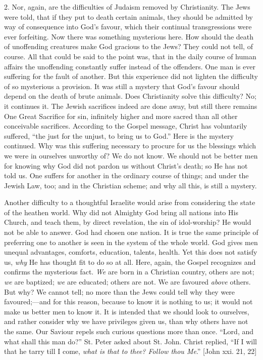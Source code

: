 2. Nor, again, are the difficulties of Judaism removed
by Christianity. The Jews were told, that if they put to
death certain animals, they should be admitted by way of
consequence into God's favour, which their continual
transgressions were ever forfeiting. Now there was
something mysterious here. How should the death of
unoffending creatures make God gracious to the Jews? They
could not tell, of course. All that could be said to the
point was, that in the daily course of human affairs the
unoffending constantly suffer instead of the offenders.
One man is ever suffering for the fault of another. But
this experience did not lighten the difficulty of so
mysterious a provision. It was still a mystery that God's
favour should depend on the death of brute animals. Does
Christianity solve this difficulty? No; it continues it.
The Jewish sacrifices indeed are done away, but still
there remains One Great Sacrifice for sin, infinitely
higher and more sacred than all other conceivable
sacrifices. According to the Gospel message, Christ has
voluntarily suffered, ``the just for the unjust, to
bring us to God.'' Here is the mystery continued. Why
was this suffering necessary to procure for us the
blessings which we were in ourselves unworthy of? We do
not know. We should not be better men for knowing why God
did not pardon us without Christ's death; so He has not
told us. One suffers for another in the ordinary course
of things; and under the Jewish Law, too; and in the
Christian scheme; and why all this, is still a mystery.

Another difficulty to a thoughtful Israelite would
arise from considering the state of the heathen world.
Why did not Almighty God bring all nations into His
Church, and teach them, by direct revelation, the sin of
idol-worship? He would not be able to answer. God had
chosen one nation. It is true the same principle of
preferring one to another is seen in the system of the whole world. God gives men unequal advantages, comforts,
education, talents, health. Yet this does not satisfy us,
\emph{why} He has thought fit to do so at all. Here,
again, the Gospel recognizes and confirms the mysterious
fact. \emph{We} are born in a Christian country, others
are not; \emph{we} are baptized; \emph{we} are
educated; others are not. We are favoured \emph{above}
others. But why? We cannot tell; no more than the Jews
could tell why they were favoured;—and for this
reason, because to know it is nothing to us; it would not
make us better men to know it. It is intended that we
should look to ourselves, and rather consider why we have
privileges given us, than why others have not the same.
Our Saviour repels such curious questions more than once.
``Lord, and what shall this man do?'' St. Peter
asked about St. John. Christ replied, ``If I will
that he tarry till I come, \emph{what is that to thee?
Follow thou Me}.'' [John xxi. 21, 22]

